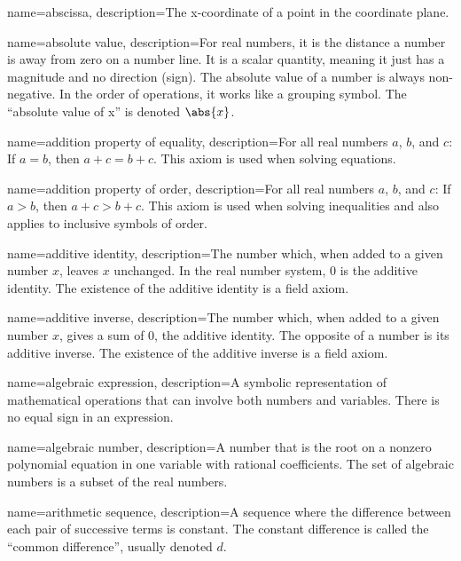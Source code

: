 
 {
	name=abscissa,
	description={The x-coordinate of a point in the coordinate plane.}
}

 {
	name=absolute value,
	description={For real numbers, it is the distance a number is away from zero on a number line. It is a scalar quantity, meaning it just has a magnitude and no direction (sign). The absolute value of a number is always non-negative. In the order of 
operations, it works like a grouping symbol. The ``absolute value of x'' is denoted $\abs{x}$.}
}

 {
	name=addition property of equality,
	description={For all real numbers $a$, $b$, and $c$: If $a = b$, then $a + c = b + c$. This axiom is used when solving equations. }
}

 {
	name=addition property of order,
	description={For all real numbers $a$, $b$, and $c$: If $a > b$, then $a + c > b + c$. This axiom is used when solving inequalities and also applies to inclusive 
symbols of order. }
}

 {
	name=additive identity,
	description={The number which, when added to a given number $x$, leaves $x$ unchanged. In the real number system, 0 is the additive identity. The existence of the additive identity is a \gls{field axiom}.}
}

 {
	name=additive inverse,
	description={The number which, when added to a given number $x$, gives a sum of 0, the additive identity. The opposite of a number is its additive inverse. The existence of the additive inverse is a \gls{field axiom}.}
}

 {
	name=algebraic expression,
	description={A symbolic representation of mathematical operations that can involve both numbers and variables. There is no equal sign in an expression.}
}

 {
	name=algebraic number,
	description={A number that is the root on a nonzero polynomial equation in one variable with rational coefficients. The set of algebraic numbers is a subset of the real numbers.}
}

 {
	name=arithmetic sequence,
	description={A sequence where the difference between each pair of successive terms is constant. The constant difference is called the ``common difference'', usually denoted $d$.}
}

